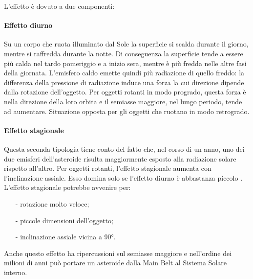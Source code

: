 L’effetto è dovuto a due componenti:

\paragraph*{Effetto diurno}
Su un corpo che ruota illuminato dal Sole la superficie si scalda durante il giorno, mentre si raffredda durante la notte. Di conseguenza la superficie tende a essere più calda nel tardo pomeriggio e a inizio sera, mentre è più fredda nelle altre fasi della giornata. L’emisfero caldo emette quindi più radiazione di quello freddo: la differenza della pressione di radiazione induce una forza la cui direzione dipende dalla rotazione dell’oggetto. Per oggetti rotanti in modo progrado, questa forza è nella direzione della loro orbita e il semiasse maggiore, nel lungo periodo, tende ad aumentare. Situazione opposta per gli oggetti che ruotano in modo retrogrado.

\paragraph*{Effetto stagionale}
Questa seconda tipologia tiene conto del fatto che, nel corso di un anno, uno dei due emisferi dell’asteroide risulta maggiormente esposto alla radiazione solare rispetto all’altro. Per oggetti rotanti, l’effetto stagionale aumenta con l’inclinazione assiale. Esso domina solo se l’effetto diurno è abbastanza piccolo \citep{Vokrouhlicky_1999}.
L’effetto stagionale potrebbe avvenire per:

\begin{itemize}
    \item[-] rotazione molto veloce;
    \item[-] piccole dimensioni dell’oggetto;
    \item[-] inclinazione assiale vicina a 90°.
\end{itemize}

Anche questo effetto ha ripercussioni sul semiasse maggiore e nell'ordine dei milioni di anni può portare un asteroide dalla Main Belt al Sistema Solare interno.

